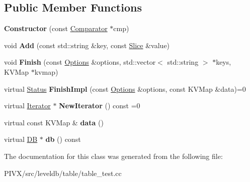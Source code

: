 \subsection*{Public Member Functions}
\begin{DoxyCompactItemize}
\item 
\mbox{\label{classleveldb_1_1_constructor_a5f4d21512e279769e881b2ae85129f08}} 
{\bfseries Constructor} (const \mbox{\hyperlink{structleveldb_1_1_comparator}{Comparator}} $\ast$cmp)
\item 
\mbox{\label{classleveldb_1_1_constructor_a5bb35f87d196065b8357200922aae69f}} 
void {\bfseries Add} (const std\+::string \&key, const \mbox{\hyperlink{classleveldb_1_1_slice}{Slice}} \&value)
\item 
\mbox{\label{classleveldb_1_1_constructor_a5c7f63378f8834cac3be93040e0e49fc}} 
void {\bfseries Finish} (const \mbox{\hyperlink{structleveldb_1_1_options}{Options}} \&options, std\+::vector$<$ std\+::string $>$ $\ast$keys, K\+V\+Map $\ast$kvmap)
\item 
\mbox{\label{classleveldb_1_1_constructor_a0f11e251cfbe990b5b0a4e7040923189}} 
virtual \mbox{\hyperlink{classleveldb_1_1_status}{Status}} {\bfseries Finish\+Impl} (const \mbox{\hyperlink{structleveldb_1_1_options}{Options}} \&options, const K\+V\+Map \&data)=0
\item 
\mbox{\label{classleveldb_1_1_constructor_a362b24b7194f605b655f5a136e0ae43c}} 
virtual \mbox{\hyperlink{classleveldb_1_1_iterator}{Iterator}} $\ast$ {\bfseries New\+Iterator} () const =0
\item 
\mbox{\label{classleveldb_1_1_constructor_a55a0363200d6e86d8beb3b15b75e3824}} 
virtual const K\+V\+Map \& {\bfseries data} ()
\item 
\mbox{\label{classleveldb_1_1_constructor_a19a344a74a682d74633c99352997fa10}} 
virtual \mbox{\hyperlink{classleveldb_1_1_d_b}{DB}} $\ast$ {\bfseries db} () const
\end{DoxyCompactItemize}


The documentation for this class was generated from the following file\+:\begin{DoxyCompactItemize}
\item 
P\+I\+V\+X/src/leveldb/table/table\+\_\+test.\+cc\end{DoxyCompactItemize}
